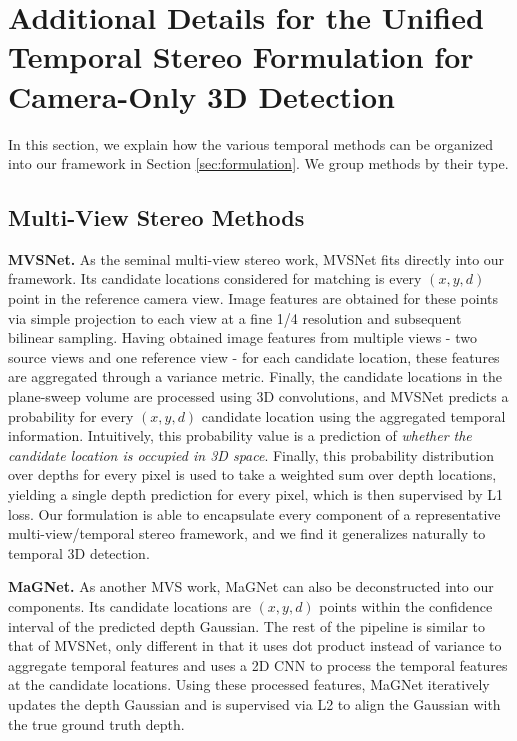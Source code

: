 \documentclass[runningheads, hyperfootnotes=false]{article}
\begin{document}
\newpage
\appendix
\section{Additional Details for the Unified Temporal Stereo Formulation for Camera-Only 3D Detection}\label{app:formulation}
In this section, we explain how the various temporal methods can be organized into our framework in Section \ref{sec:formulation}. We group methods by their type.
\subsection{Multi-View Stereo Methods}
\noindent\textbf{MVSNet.} As the seminal multi-view stereo work, MVSNet fits directly into our framework. Its candidate locations considered for matching is every $(x, y, d)$ point in the reference camera view. Image features are obtained for these points via simple projection to each view at a fine 1/4 resolution and subsequent bilinear sampling. Having obtained image features from multiple views - two source views and one reference view - for each candidate location, these features are aggregated through a variance metric. Finally, the candidate locations in the plane-sweep volume are processed using 3D convolutions, and MVSNet predicts a probability for every $(x, y, d)$ candidate location using the aggregated temporal information. Intuitively, this probability value is a prediction of \textit{whether the candidate location is occupied in 3D space}. Finally, this probability distribution over depths for every pixel is used to take a weighted sum over depth locations, yielding a single depth prediction for every pixel, which is then supervised by L1 loss. Our formulation is able to encapsulate every component of a representative multi-view/temporal stereo framework, and we find it generalizes naturally to temporal 3D detection.

\noindent\textbf{MaGNet.} As another MVS work, MaGNet can also be deconstructed into our components. Its candidate locations are $(x, y, d)$ points within the confidence interval of the predicted depth Gaussian. The rest of the pipeline is similar to that of MVSNet, only different in that it uses dot product instead of variance to aggregate temporal features and uses a 2D CNN to process the temporal features at the candidate locations. Using these processed features, MaGNet iteratively updates the depth Gaussian and is supervised via L2 to align the Gaussian with the true ground truth depth. 
\end{document}
